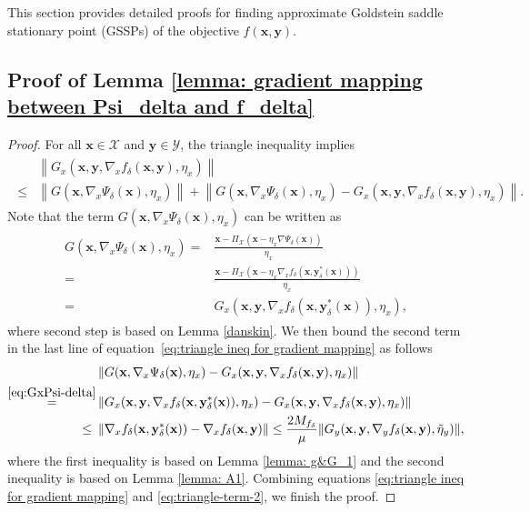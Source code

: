 \documentclass[11pt]{article}
\def\vx{\mathbf{x}}
\def\vy{\mathbf{y}}
\def\fX{{\mathcal{X}}}
\def\fY{{\mathcal{Y}}}
\newcommand{\norm}[1]{\left\| #1 \right\|}
\begin{document}
This section provides detailed proofs for finding approximate Goldstein saddle stationary point (GSSPs) of the objective $f(\vx,\vy)$.

\subsection{Proof of Lemma \ref{lemma: gradient mapping between Psi_delta and f_delta}}
\begin{proof}
For all $\vx\in\fX$ and $\vy\in\fY$, the triangle inequality implies
\begin{align}\label{eq:triangle ineq for gradient mapping}
\begin{split}
    &\norm{G_x(\vx,\vy,\nabla_x f_\delta(\vx,\vy),\eta_x)}\\
\leq&  \norm{G(\vx,\nabla_x \Psi_\delta(\vx),\eta_x)} + \norm{G(\vx,\nabla_x \Psi_\delta(\vx),\eta_x)
-G_x(\vx,\vy,\nabla_x f_\delta(\vx,\vy),\eta_x)}.
\end{split}
\end{align}
Note that the term $G(\vx,\nabla_x \Psi_\delta(\vx),\eta_x)$ can be written as
\begin{align}\label{eq:GxPsi-delta}
\begin{split}    
   G(\vx,\nabla_x \Psi_\delta(\vx),\eta_x) 
= & \frac{\vx-\Pi_\mathcal{X}(\vx-\eta_x \nabla \Psi_\delta(\vx))}{\eta_x} \\
= & \frac{\vx-\Pi_\fX(\vx-\eta_x \nabla_x f_\delta(\vx,\vy_\delta^*(\vx)))}{\eta_x} \\
= & G_x(\vx,\vy,\nabla_x f_\delta(\vx,\vy_\delta^*(\vx)),\eta_x),
\end{split}
\end{align}
where second step is based on Lemma \ref{danskin}. We then bound the second term in the last line of equation~\eqref{eq:triangle ineq for gradient mapping} as follows
\begin{align}\label{eq:triangle-term-2}
\begin{split}    
   & \norm{G(\vx,\nabla_x \Psi_\delta(\vx),\eta_x)
-G_x(\vx,\vy,\nabla_x f_\delta(\vx,\vy),\eta_x)} \\
\overset{\eqref{eq:GxPsi-delta}}= & \norm{G_x(\vx,\vy,\nabla_x f_\delta(\vx, \vy_\delta^*(\vx)),\eta_x)
-G_x(\vx,\vy,\nabla_x f_\delta(\vx,\vy),\eta_x)}    \\
~\le~& \norm{\nabla_x f_\delta(\vx, \vy_\delta^*(\vx)) - \nabla_x f_\delta(\vx,\vy)} 
\leq \frac{2M_{f_\delta}}{\mu}\| G_y(\vx, \vy,\nabla_y f_\delta(\vx,\vy),\tilde\eta_y) \|,
\end{split}
\end{align}
where the first inequality is based on Lemma \ref{lemma: g&G_1} and the second inequality is based on Lemma \ref{lemma: A1}.
Combining equations \eqref{eq:triangle ineq for gradient mapping} and  \eqref{eq:triangle-term-2}, we finish the proof.
\end{proof}
\end{document}

